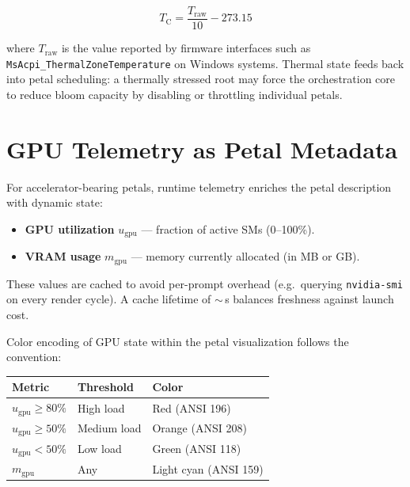 \documentclass[11pt, a4paper, oneside]{article}
\theoremstyle{definition}
\newcommand{\type}[1]{\texttt{#1}}
\begin{document}
\begin{equation}
  T_{\text{C}} = \frac{T_{\text{raw}}}{10} - 273.15
\end{equation}

where $T_{\text{raw}}$ is the value reported by firmware interfaces such as
\type{MsAcpi\_ThermalZoneTemperature} on Windows systems.  Thermal state
feeds back into petal scheduling: a thermally stressed root may force the
orchestration core to reduce bloom capacity by disabling or throttling
individual petals.

\section{GPU Telemetry as Petal Metadata}

For accelerator-bearing petals, runtime telemetry enriches the petal
description with dynamic state:

\begin{itemize}
  \item \textbf{GPU utilization} $u_{\text{gpu}}$ — fraction of active SMs
        (0--100\%).
  \item \textbf{VRAM usage} $m_{\text{gpu}}$ — memory currently allocated
        (in MB or GB).
\end{itemize}

These values are cached to avoid per-prompt overhead (e.g.\ querying
\type{nvidia-smi} on every render cycle).  A cache lifetime of
$\sim$\,s balances freshness against launch cost.

Color encoding of GPU state within the petal visualization follows the
convention:

\begin{center}
\begin{tabular}{@{} l l l @{}}
\toprule
\textbf{Metric} & \textbf{Threshold} & \textbf{Color} \\
\midrule
$u_{\text{gpu}} \ge 80\%$  & High load    & Red (ANSI 196) \\
$u_{\text{gpu}} \ge 50\%$  & Medium load  & Orange (ANSI 208) \\
$u_{\text{gpu}} < 50\%$    & Low load     & Green (ANSI 118) \\
$m_{\text{gpu}}$            & Any          & Light cyan (ANSI 159) \\
\bottomrule
\end{tabular}
\end{center}
\end{document}
